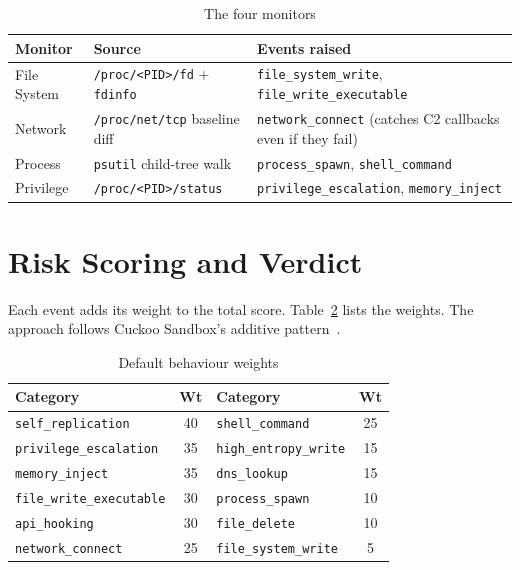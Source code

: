 \documentclass[12pt, a4paper]{report}
\begin{document}
\begin{table}[H]
\centering
\caption{The four monitors}
\label{tab:sb_monitors}
\begin{tabular}{|l|p{4.3cm}|p{5.5cm}|}
\hline
\textbf{Monitor} & \textbf{Source} & \textbf{Events raised} \\
\hline
File System & \texttt{/proc/<PID>/fd} + \texttt{fdinfo} & \texttt{file\_system\_write}, \texttt{file\_write\_executable} \\
\hline
Network & \texttt{/proc/net/tcp} baseline diff & \texttt{network\_connect} (catches C2 callbacks even if they fail) \\
\hline
Process & \texttt{psutil} child-tree walk & \texttt{process\_spawn}, \texttt{shell\_command} \\
\hline
Privilege & \texttt{/proc/<PID>/status} & \texttt{privilege\_escalation}, \texttt{memory\_inject} \\
\hline
\end{tabular}
\end{table}

\section{Risk Scoring and Verdict}

Each event adds its weight to the total score. Table~\ref{tab:sb_weights}
lists the weights. The approach follows Cuckoo Sandbox's additive
pattern~\cite{bayer2009scalable}.

\begin{table}[H]
\centering
\caption{Default behaviour weights}
\label{tab:sb_weights}
\begin{tabular}{|l|c||l|c|}
\hline
\textbf{Category} & \textbf{Wt} & \textbf{Category} & \textbf{Wt} \\
\hline
\texttt{self\_replication} & 40 & \texttt{shell\_command} & 25 \\
\hline
\texttt{privilege\_escalation} & 35 & \texttt{high\_entropy\_write} & 15 \\
\hline
\texttt{memory\_inject} & 35 & \texttt{dns\_lookup} & 15 \\
\hline
\texttt{file\_write\_executable} & 30 & \texttt{process\_spawn} & 10 \\
\hline
\texttt{api\_hooking} & 30 & \texttt{file\_delete} & 10 \\
\hline
\texttt{network\_connect} & 25 & \texttt{file\_system\_write} & 5 \\
\hline
\end{tabular}
\end{table}
\end{document}
